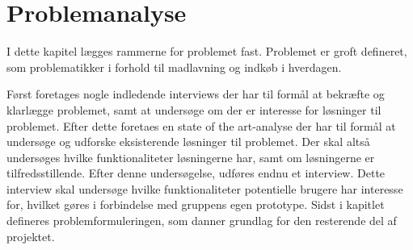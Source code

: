 \chapter{Problemanalyse}\label{chapter:problemanalyse}
I dette kapitel lægges rammerne for problemet fast.
Problemet er groft defineret, som problematikker i forhold til madlavning og indkøb i hverdagen.

Først foretages nogle indledende interviews der har til formål at bekræfte og klarlægge problemet, samt at undersøge om der er interesse for løsninger til problemet.
Efter dette foretaes en state of the art-analyse der har til formål at undersøge og udforske eksisterende løsninger til problemet.
Der skal altså undersøges hvilke funktionaliteter løsningerne har, samt om løsningerne er tilfredsstillende.
Efter denne undersøgelse, udføres endnu et interview.
Dette interview skal undersøge hvilke funktionaliteter potentielle brugere har interesse for, hvilket gøres i forbindelse med gruppens egen prototype.
Sidst i kapitlet defineres problemformuleringen, som danner grundlag for den resterende del af projektet.





